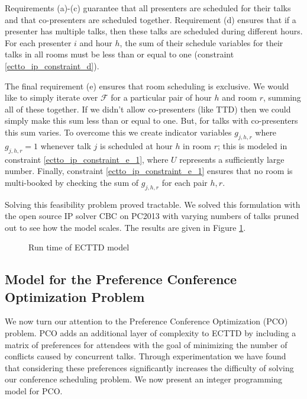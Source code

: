 \documentclass{svjour3}                     %
\begin{document}
Requirements (a)-(c) guarantee that all presenters are scheduled for their talks and that co-presenters are scheduled together. 
Requirement (d) ensures that if a presenter has multiple talks, then these talks are scheduled during different hours.  
For each presenter $i$ and hour $h$, the sum of their schedule variables for their talks in all rooms must be less than or equal to one (constraint \eqref{ectto_ip_constraint_d}).

The final requirement (e) ensures that room scheduling is exclusive. 
We would like to simply iterate over $\mathcal F$ for a particular pair of hour $h$ and room $r$, summing all of these together. 
If we didn't allow co-presenters (like TTD) then we could simply make this sum less than or equal to one. But, for talks with co-presenters this sum varies. 
To overcome this we create indicator variables $g_{j,h,r}$ where $g_{j,h,r}=1$ whenever talk $j$ is scheduled at hour $h$ in room $r$; 
this is modeled in constraint \eqref{ectto_ip_constraint_e_1}, where $U$ represents a sufficiently large number.
Finally, constraint \eqref{ectto_ip_constraint_e_1} ensures that no room is multi-booked by checking the sum of $g_{j,h,r}$ for each pair $h,r$.

Solving this feasibility problem proved tractable. 
We solved this formulation with the open source IP solver CBC on PC2013 with varying numbers of talks pruned out to see how the model scales. 
The results are given in Figure \ref{ectto_run_time}.
\begin{figure}[h!]
	\caption{Run time of ECTTD model}
	\centering
	
	\label{ectto_run_time}
\end{figure}

\subsection{Model for the Preference Conference Optimization Problem}
We now turn our attention to the Preference Conference Optimization (PCO) problem. 
PCO adds an additional layer of complexity to ECTTD by including a matrix of preferences for attendees with the goal of minimizing the number of conflicts caused by concurrent talks. 
Through experimentation we have found that considering these preferences significantly increases the difficulty of solving our conference scheduling problem. 
We now present an integer programming model for PCO.
\end{document}
